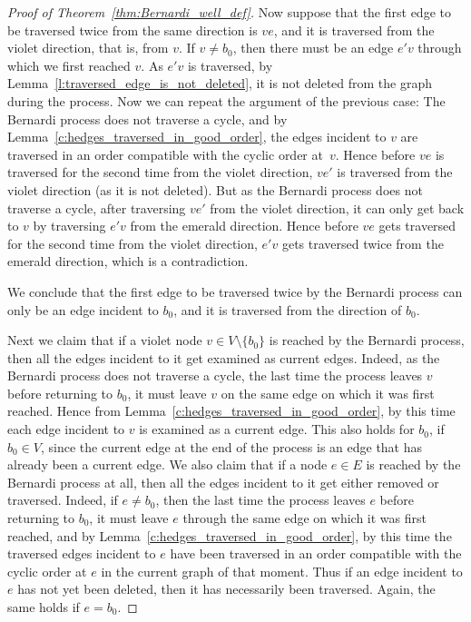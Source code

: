 \documentclass[ALCO,ThmDefs,Unicode,epreuves]{cedram}
\begin{document}
\begin{proof}[Proof of Theorem~\ref{thm:Bernardi_well_def}]
Now suppose that the first edge to be traversed twice from the same direction is $ve$, and it is traversed from the violet direction, that is, from $v$. If $v\neq b_0$, then there must be an edge $e'v$ through which we first reached $v$. As $e'v$ is traversed, by Lemma~\ref{l:traversed_edge_is_not_deleted}, it is not deleted from the graph during the process. Now we can repeat the argument of the previous case: The Bernardi process does not traverse a cycle, and by Lemma~\ref{c:hedges_traversed_in_good_order}, the edges incident to $v$ are traversed in an order compatible with the cyclic order at~$v$. Hence before $ve$ is traversed for the second time from the violet direction, $ve'$ is traversed from the violet direction (as it is not deleted). But as the Bernardi process does not traverse a cycle, after traversing $ve'$ from the violet direction, it can only get back to $v$ by traversing $e'v$ from the emerald direction. Hence before $ve$ gets traversed for the second time from the violet direction, $e'v$ gets traversed twice from the emerald direction, which is a contradiction.

We conclude that the first edge to be traversed twice by the Bernardi process can only be an edge incident to $b_0$, and it is traversed from the direction of $b_0$.

Next we claim that if a violet node $v\in V\setminus\{b_0\}$ is reached by the Bernardi process, then all the edges incident to it get examined as current edges. Indeed, as the Bernardi process does not traverse a cycle, the last time the process leaves $v$ before returning to $b_0$, it must leave $v$ on the same edge on which it was first reached. Hence from Lemma~\ref{c:hedges_traversed_in_good_order}, by this time each edge incident to $v$ is examined as a current edge. This also holds for $b_0$, if $b_0\in V$, since the current edge at the end of the process is an edge that has already been a current edge. We also claim that if a node $e\in E$ is reached by the Bernardi process at all, then all the edges incident to it get either removed or traversed. Indeed, if $e\ne b_0$, then the last time the process leaves $e$ before returning to $b_0$, it must leave $e$ through the same edge on which it was first reached, and by Lemma~\ref{c:hedges_traversed_in_good_order}, by this time the traversed edges incident to $e$ have been traversed in an order compatible with the cyclic order at $e$ in the current graph of that moment. Thus if an edge incident to $e$ has not yet been deleted, then it has necessarily been traversed. Again, the same holds if $e=b_0$.


\end{proof}
\end{document}
